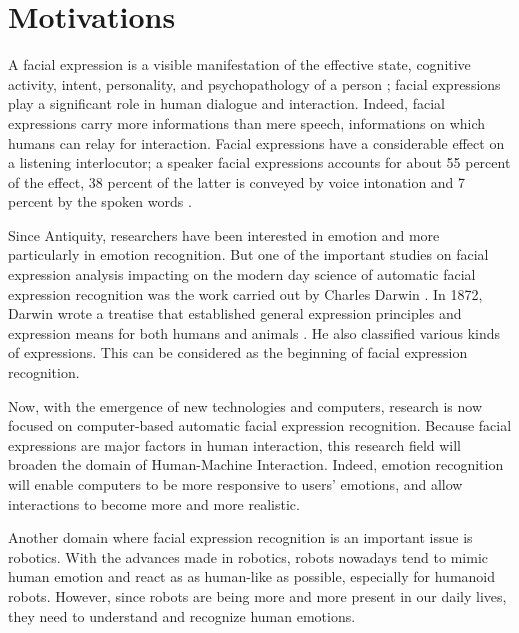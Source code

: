 \chapter{Motivations}

\noindent A facial expression is a visible manifestation of the effective state, cognitive activity, intent, personality, and psychopathology of a person \cite{DON99}; facial expressions play a significant role in human dialogue and interaction. Indeed, facial expressions carry more informations than mere speech, informations on which humans can relay for interaction. Facial expressions have a considerable effect on a listening interlocutor; a speaker facial expressions accounts for about 55 percent of the effect, 38 percent of the latter is conveyed by voice intonation and 7 percent by the spoken words \cite{PAN00}.
\newline

\noindent Since Antiquity, researchers have been interested in emotion and more particularly in emotion recognition. But one of the important studies on facial expression analysis impacting on the modern day science of automatic facial expression recognition was the work carried out by Charles Darwin \cite{BET12}. In 1872, Darwin wrote a treatise that established general expression principles and expression means for both humans and animals \cite{DAR04}. He also classified various kinds of expressions. This can be considered as the beginning of facial expression recognition.
\newline

\noindent Now, with the emergence of new technologies and computers, research is now focused on computer-based automatic facial expression recognition. Because facial expressions are major factors in human interaction, this research field will broaden the domain of Human-Machine Interaction. Indeed, emotion recognition will enable computers to be more responsive to users' emotions, and allow interactions to become more and more realistic. 
\newline

\noindent Another domain where facial expression recognition is an important issue is robotics. With the advances made in robotics, robots nowadays tend to mimic human emotion and react as as human-like as possible, especially for humanoid robots. However, since robots are being more and more present in our daily lives, they need to understand and recognize human emotions.
\newline

